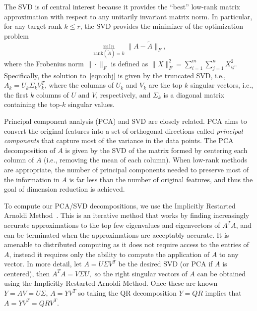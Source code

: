 The SVD is of central interest because it provides the ``best'' low-rank matrix
approximation with respect to any unitarily invariant matrix norm.  In
particular, for any target rank $k \leq r$, the SVD provides the minimizer of
the optimization problem
\begin{equation}
 \label{eqn:obj}
  \min_{\text{rank}(\tilde A) = k} \| A - \tilde A \|_F,
\end{equation}
where the Frobenius norm $\| \cdot \|_F$ is defined as $\|X\|_F^2 =
\sum_{i=1}^m \sum_{j=1}^n X_{ij}^2 $. Specifically, the solution
to~\eqref{eqn:obj} is given by the truncated SVD, i.e., $A_k = U_k \Sigma_k
V_k^T$, where the columns of $U_k$ and $V_k$ are the top $k$ singular vectors,
i.e., the first $k$ columns of $U$ and $V$, respectively, and $\Sigma_k$ is a 
diagonal matrix containing the top-$k$ singular values.

Principal component analysis (PCA) and SVD are closely related.  PCA aims to
convert the original features into a set of orthogonal directions called {\it
principal components} that capture most of the variance in the data points.
The PCA decomposition of $A$ is given by the SVD of the matrix formed by
centering each column of $A$ (i.e., removing the mean of each column).  When
low-rank methods are appropriate, the number of principal components needed to
preserve most of the information in $A$ is far less than the number of original
features, and thus the goal of dimension reduction is achieved.

To compute our PCA/SVD decompositions, we use the Implicitly Restarted Arnoldi Method~\cite{ArpackUserGuide}.
This is an iterative method that works by finding increasingly accurate approximations to the top few eigenvalues
and eigenvectors of $A^TA$, and can be terminated when the approximations are acceptably accurate. It  
is amenable to distributed computing as it does not require access to the entries of $A$, 
instead it requires only the ability to compute the application of $A$ to any vector. In more detail, let
$A = U\Sigma V^T$ be the desired SVD (or PCA if $A$ is centered), then
$A^TA = V \Sigma U,$ so the right singular vectors of $A$ can be obtained using
the Implicitly Restarted Arnoldi Method. Once these are known $Y = AV = U \Sigma$,  
$A = YV^T $ so taking the QR decomposition $Y = QR$ implies that $A = YV^T = Q RV^T$. 


